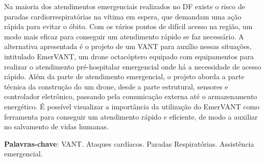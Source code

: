 \begin{resumo}
Na maioria dos atendimentos emergenciais realizados no DF existe o risco de paradas cardiorrespiratórias na vítima em espera, 
que demandam uma ação rápida para evitar o óbito. Com os vários pontos de difícil acesso na região, um modo mais eficaz para conseguir um atendimento 
rápido se faz necessário. A alternativa apresentada é o projeto de um VANT para auxílio nessas situações, intitulado EmerVANT, um drone octacóptero
equipado com equipamentos para realizar o atendimento pré-hospitalar emergencial onde há a necessidade de acesso rápido. Além da parte de atendimento emergencial, 
o projeto aborda a parte técnica da construção do um drone, desde a parte estrutural, sensores e controlador eletrônico, passando pela comunicação externa até o 
armazenamento energético. É possível visualizar a importância da utilização do EmerVANT como ferramenta para conseguir um atendimento rápido e eficiente, de modo a
auxiliar no salvamento de vidas humanas.


 \vspace{\onelineskip}
    
 \noindent
 \textbf{Palavras-chave}: VANT. Ataques cardíacos. Paradas Respiratórias. Assistência emergencial. 
\end{resumo}
